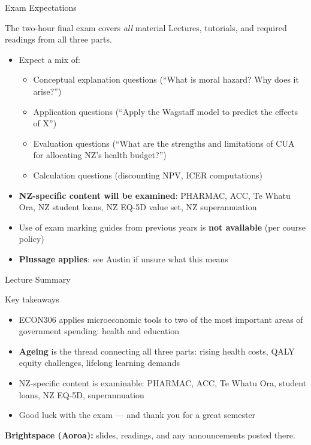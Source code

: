 \documentclass[aspectratio=169, 12pt]{beamer}
\newcommand{\summaryside}[1]{%
  \begin{frame}{Lecture Summary}
    \begin{exampleblock}{Key takeaways}
      \begin{itemize}#1\end{itemize}
    \end{exampleblock}
    \vspace{0.5em}
    {\footnotesize\textcolor{OtagoGold}{\textbf{Brightspace (Aoroa):}} slides, readings, and any announcements posted there.}
  \end{frame}}
\begin{document}
\begin{frame}{Exam Expectations}
  \begin{block}{The two-hour final exam covers \emph{all} material}
    Lectures, tutorials, and required readings from all three parts.
  \end{block}
  \vspace{0.3em}
  \begin{itemize}
    \item Expect a mix of:
    \begin{itemize}
      \item Conceptual explanation questions (``What is moral hazard? Why does it arise?'')
      \item Application questions (``Apply the Wagstaff model to predict the effects of X'')
      \item Evaluation questions (``What are the strengths and limitations of CUA for
            allocating NZ's health budget?'')
      \item Calculation questions (discounting NPV, ICER computations)
    \end{itemize}
    \item \textbf{NZ-specific content will be examined}: PHARMAC, ACC, Te Whatu Ora,
          NZ student loans, NZ EQ-5D value set, NZ superannuation
    \item Use of exam marking guides from previous years is \textbf{not available}
          (per course policy)
    \item \textbf{Plussage applies}: see Austin if unsure what this means
  \end{itemize}
\end{frame}

\summaryside{
  \item ECON306 applies microeconomic tools to two of the most important areas of government spending: health and education
  \item \textbf{Ageing} is the thread connecting all three parts: rising health costs, QALY equity challenges, lifelong learning demands
  \item NZ-specific content is examinable: PHARMAC, ACC, Te Whatu Ora, student loans, NZ EQ-5D, superannuation
  \item Good luck with the exam --- and thank you for a great semester
}
\end{document}
